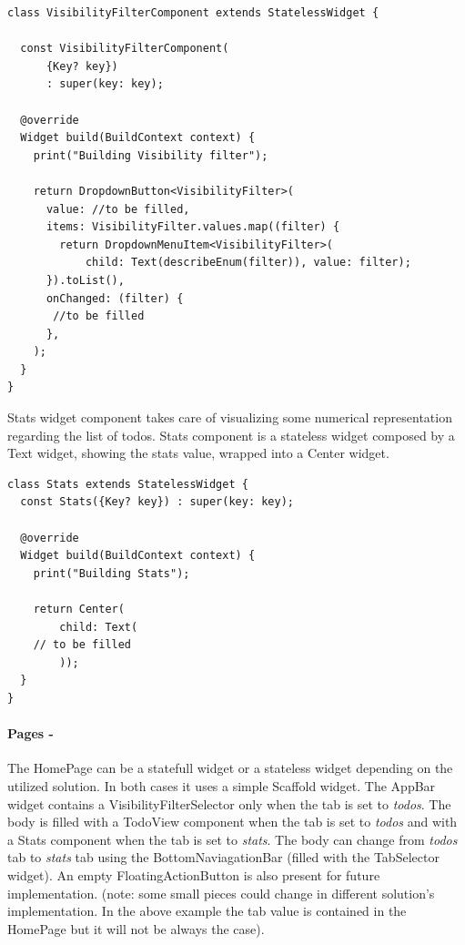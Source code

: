 	\mbox{}
	\begin{code}
 \mbox{}
		\label{code:2.12}
\begin{verbatim}
class VisibilityFilterComponent extends StatelessWidget {

  const VisibilityFilterComponent(
      {Key? key})
      : super(key: key);

  @override
  Widget build(BuildContext context) {
    print("Building Visibility filter");
    
    return DropdownButton<VisibilityFilter>(
      value: //to be filled,
      items: VisibilityFilter.values.map((filter) {
        return DropdownMenuItem<VisibilityFilter>(
            child: Text(describeEnum(filter)), value: filter);
      }).toList(),
      onChanged: (filter) {
       //to be filled
      },
    );
  }
}

	\end{verbatim}
	\end{code}

Stats widget component takes care of visualizing some numerical representation regarding the list of todos. Stats component is a stateless widget composed by a Text widget, showing the stats value, wrapped into a Center widget.
	
	\mbox{}
	\begin{code}
	 \mbox{}
		\label{code:2.13}
	\begin{verbatim}
class Stats extends StatelessWidget {
  const Stats({Key? key}) : super(key: key);

  @override
  Widget build(BuildContext context) {
    print("Building Stats");

    return Center(
        child: Text(
	// to be filled        
        ));
  }
}
	\end{verbatim}
	\end{code}
	\paragraph{Pages - } 
	\label{par:todo_app_pages}
The HomePage can be a statefull widget or a stateless  widget depending on the utilized solution. In both cases it uses a simple Scaffold widget. The AppBar widget contains a VisibilityFilterSelector only when the tab is set to \textit{todos}. The body is filled with a TodoView component when the tab is set to \textit{todos} and with a Stats component when the tab is set to \textit{stats}. The body can change from \textit{todos} tab to \textit{stats} tab using the BottomNaviagationBar (filled with the TabSelector widget). An empty FloatingActionButton is also present for future implementation.
	(note: some small pieces could change in different solution’s implementation. In the above example the tab value is contained in the HomePage but it will not be always the case).

